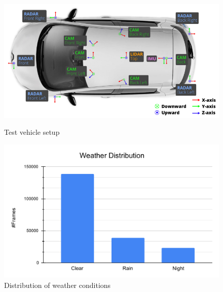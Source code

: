 \documentclass[report.tex]{subfiles}
\begin{document}
        \begin{figure}[h]
            \centering
            \begin{minipage}{0.48\textwidth}
                \centering
                \includegraphics[width=\textwidth]{images/datasets/nuscenes/test_vehicle_setup.png}
                \caption{Test vehicle setup \cite{caesar2020nuscenes}}
                \label{fig:nuscenes_test_vehicle_setup}
            \end{minipage}
            \hfill
            \begin{minipage}{0.48\textwidth}
                \centering
                \includegraphics[width=\textwidth]{images/datasets/nuscenes/distribution_of_weather_conditions.pdf}
                \caption{Distribution of weather conditions \cite{caesar2020nuscenes}}
                \label{fig:nuscenes_distribution_of_weather_conditions}
            \end{minipage}
        \end{figure}
        

\end{document}

